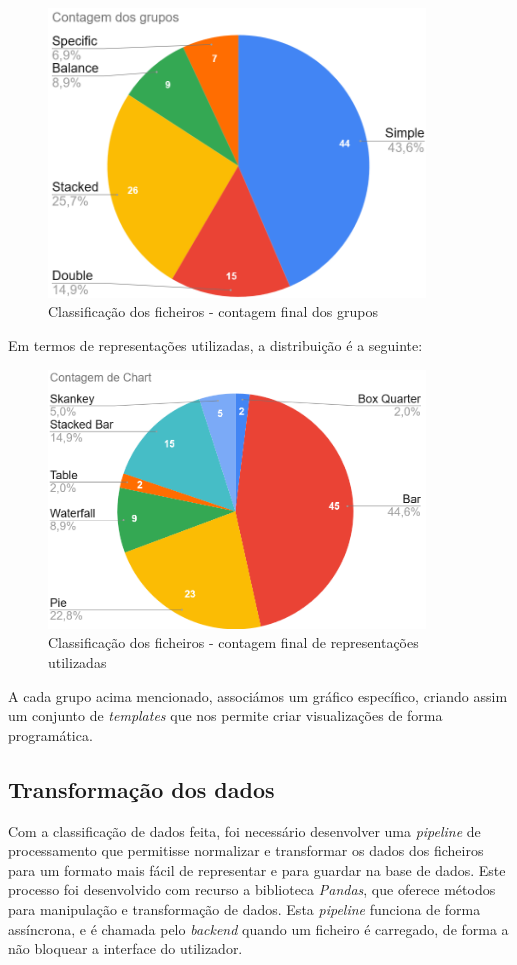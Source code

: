 \begin{figure}[h]
    \centering
    \includegraphics[max width=10cm]{./img/stats1}
 \caption{Classificação dos ficheiros - contagem final dos grupos}
 \end{figure}

Em termos de representações utilizadas, a distribuição é a seguinte:
\begin{figure}[h]
    \centering
    \includegraphics[max width=10cm]{./img/stats2}
 \caption{Classificação dos ficheiros - contagem final de representações utilizadas}
 \end{figure}


A cada grupo acima mencionado, associámos um gráfico específico, criando assim um conjunto de \textit{templates} que nos permite criar visualizações de forma programática.

\subsection{Transformação dos dados}

Com a classificação de dados feita, foi necessário desenvolver uma \textit{pipeline} de processamento que permitisse normalizar e transformar os dados dos ficheiros para um formato mais fácil de representar e para guardar na base de dados. Este processo foi desenvolvido com recurso a biblioteca \textit{Pandas}, que oferece métodos para manipulação e transformação de dados. Esta \textit{pipeline} funciona de forma assíncrona, e é chamada pelo \textit{backend} quando um ficheiro é carregado, de forma a não bloquear a interface do utilizador.

